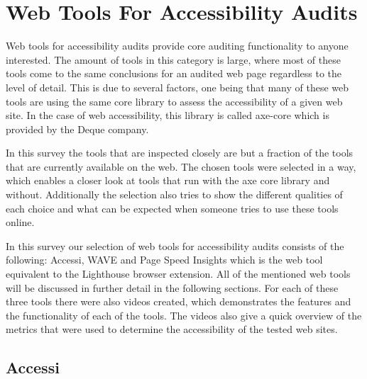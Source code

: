 %
%
% 
% 
% 


\chapter{Web Tools For Accessibility Audits}

\label{chap:WebTools}



Web tools for accessibility audits provide core auditing functionality to anyone interested. The amount of tools in this category is large, where most of these tools come to the same conclusions for an audited web page regardless to the level of detail. This is due to several factors, one being that many of these web tools are using the same core library to assess the accessibility of a given web site. In the case of web accessibility, this library is called axe-core which is provided by the Deque company.

In this survey the tools that are inspected closely are but a fraction of the tools that are currently available on the web. The chosen tools were selected in a way, which enables a closer look at tools that run with the axe core library and without. Additionally the selection also tries to show the different qualities of each choice and what can be expected when someone tries to use these tools online.

In this survey our selection of web tools for accessibility audits consists of the following: Accessi, WAVE and Page Speed Insights which is the web tool equivalent to the Lighthouse browser extension. All of the mentioned web tools will be discussed in further detail in the following sections. For each of these three tools there were also videos created, which demonstrates the features and the functionality of each of the tools. The videos also give a quick overview of the metrics that were used to determine the accessibility of the tested web sites. 

\section{Accessi}

